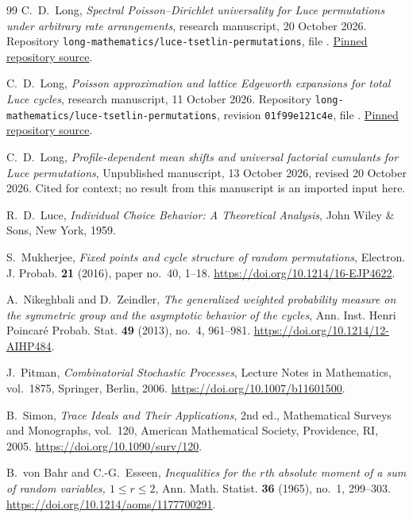 \documentclass[11pt]{article}
\numberwithin{equation}{section}
\theoremstyle{definition}
\theoremstyle{remark}
\begin{document}
\begin{thebibliography}{99}
C.~D.~Long,
\emph{Spectral Poisson--Dirichlet universality for Luce permutations
under arbitrary rate arrangements},
research manuscript, 20 October 2026.
Repository \texttt{long-mathematics/luce-tsetlin-permutations},
file .
\href{https://github.com/long-mathematics/luce-tsetlin-permutations/blob/81462993a7400f972a3d75583d447fbeccf1e7b3/papers/macroscopic-pd/spectral-poisson-dirichlet-luce.tex}{Pinned repository source}.

C.~D.~Long,
\emph{Poisson approximation and lattice Edgeworth expansions for total Luce cycles},
research manuscript, 11 October 2026.
Repository \texttt{long-mathematics/luce-tsetlin-permutations},
revision \texttt{01f99e121c4e}, file
.
\href{https://github.com/long-mathematics/luce-tsetlin-permutations/tree/01f99e121c4ea497e3c9e9bcfa83d027c5833742/papers/total-cycle-edgeworth}{Pinned repository source}.

C.~D.~Long,
\emph{Profile-dependent mean shifts and universal factorial cumulants for Luce permutations},
Unpublished manuscript, 13 October 2026, revised 20 October 2026.
Cited for context; no result from this manuscript is an imported input here.

R.~D.~Luce,
\emph{Individual Choice Behavior: A Theoretical Analysis},
John Wiley \& Sons, New York, 1959.

S.~Mukherjee,
\emph{Fixed points and cycle structure of random permutations},
Electron. J. Probab. \textbf{21} (2016), paper no.~40, 1--18.
\url{https://doi.org/10.1214/16-EJP4622}.

A.~Nikeghbali and D.~Zeindler,
\emph{The generalized weighted probability measure on the symmetric group and the asymptotic behavior of the cycles},
Ann. Inst. Henri Poincar\'e Probab. Stat. \textbf{49} (2013), no.~4, 961--981.
\url{https://doi.org/10.1214/12-AIHP484}.

J.~Pitman,
\emph{Combinatorial Stochastic Processes},
Lecture Notes in Mathematics, vol.~1875, Springer, Berlin, 2006.
\url{https://doi.org/10.1007/b11601500}.

B.~Simon,
\emph{Trace Ideals and Their Applications}, 2nd ed.,
Mathematical Surveys and Monographs, vol.~120,
American Mathematical Society, Providence, RI, 2005.
\url{https://doi.org/10.1090/surv/120}.

B.~von Bahr and C.-G.~Esseen,
\emph{Inequalities for the $r$th absolute moment of a sum of random variables, $1\le r\le2$},
Ann. Math. Statist. \textbf{36} (1965), no.~1, 299--303.
\url{https://doi.org/10.1214/aoms/1177700291}.

\end{thebibliography}
\end{document}

